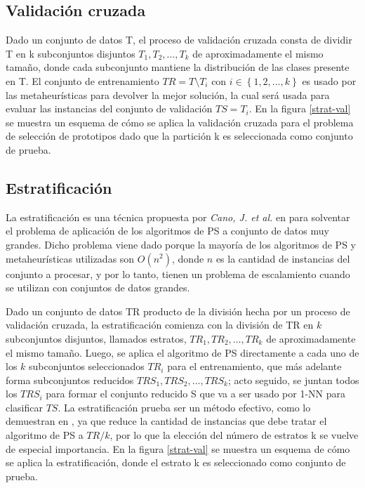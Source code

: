 \subsection{Validación cruzada}

Dado un conjunto de datos T, el proceso de validación cruzada \cite{kohavi1995study} consta de dividir T en k subconjuntos disjuntos $T_1,T_2,\dots,T_k$ de aproximadamente el mismo tamaño, donde cada subconjunto mantiene la distribución de las clases presente en T. El conjunto de entrenamiento $TR = T \setminus T_i$ con $i \in \left\{1,2,\dots,k\right\}$ es usado por las metaheurísticas para devolver la mejor solución, la cual será usada para evaluar las instancias del conjunto de validación $ TS = T_i $. En la figura \ref{strat-val} se muestra un esquema de cómo se aplica la validación cruzada para el problema de selección de prototipos dado que la partición k es seleccionada como conjunto de prueba.


\subsection{Estratificación}

La estratificación es una técnica propuesta por \emph{Cano, J. et al.} en \cite{cano2005stratification} para solventar el problema de aplicación de los algoritmos de PS a conjunto de datos muy grandes. Dicho problema viene dado porque la mayoría de los algoritmos de PS y metaheurísticas utilizadas son $O(n^2)$, donde $n$ es la cantidad de instancias del conjunto a procesar, y por lo tanto, tienen un problema de escalamiento cuando se utilizan con conjuntos de datos grandes.

Dado un conjunto de datos TR producto de la división hecha por un proceso de validación cruzada, la estratificación comienza con la división de TR en $k$ subconjuntos disjuntos, llamados estratos, $TR_1,TR_2,\dots,TR_k$ de aproximadamente el mismo tamaño. Luego, se aplica el algoritmo de PS directamente a cada uno de los $k$ subconjuntos seleccionados $TR_i$ para el entrenamiento, que más adelante forma subconjuntos reducidos $TRS_1,TRS_2,\dots,TRS_k$; acto seguido, se juntan todos los $TRS_i$ para formar el conjunto reducido S que va a ser usado por 1-NN para clasificar $TS$. La estratificación prueba ser un método efectivo, como lo demuestran en \cite{cano2005stratification}, ya que reduce la cantidad de instancias que debe tratar el algoritmo de PS a $TR/k$, por lo que la elección del número de estratos k se vuelve de especial importancia. En la figura \ref{strat-val} se muestra un esquema de cómo se aplica la estratificación, donde el estrato k es seleccionado como conjunto de prueba.

